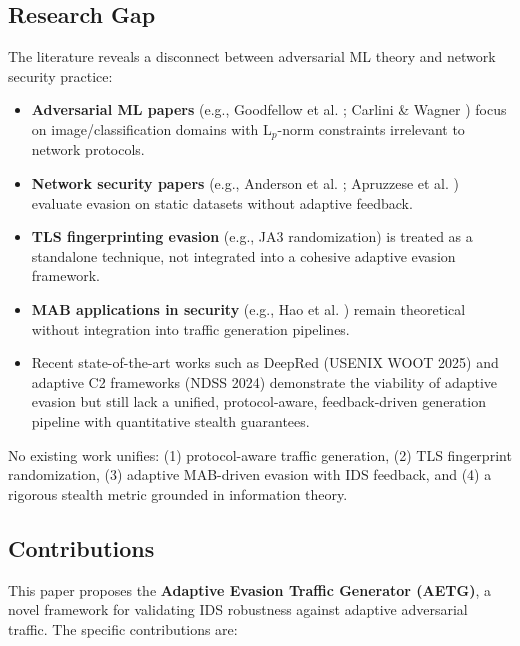 \documentclass[review]{elsarticle}
\begin{document}
\subsection{Research Gap}
The literature reveals a disconnect between adversarial ML theory and network security practice:
\begin{itemize}
\item \textbf{Adversarial ML papers} (e.g., Goodfellow et al. \cite{goodfellow2015explaining}; Carlini \& Wagner \cite{carlini2017towards}) focus on image/classification domains with L$_p$-norm constraints irrelevant to network protocols.
\item \textbf{Network security papers} (e.g., Anderson et al. \cite{anderson2017learning}; Apruzzese et al. \cite{apruzzese2021role}) evaluate evasion on static datasets without adaptive feedback.
\item \textbf{TLS fingerprinting evasion} (e.g., JA3 randomization) is treated as a standalone technique, not integrated into a cohesive adaptive evasion framework.
\item \textbf{MAB applications in security} (e.g., Hao et al. \cite{hao2020moving}) remain theoretical without integration into traffic generation pipelines.
\item Recent state-of-the-art works such as DeepRed (USENIX WOOT 2025) \cite{deepred2025} and adaptive C2 frameworks (NDSS 2024) demonstrate the viability of adaptive evasion but still lack a unified, protocol-aware, feedback-driven generation pipeline with quantitative stealth guarantees.
\end{itemize}

No existing work unifies: (1) protocol-aware traffic generation, (2) TLS fingerprint randomization, (3) adaptive MAB-driven evasion with IDS feedback, and (4) a rigorous stealth metric grounded in information theory.

\subsection{Contributions}
This paper proposes the \textbf{Adaptive Evasion Traffic Generator (AETG)}, a novel framework for validating IDS robustness against adaptive adversarial traffic. The specific contributions are:
\end{document}
